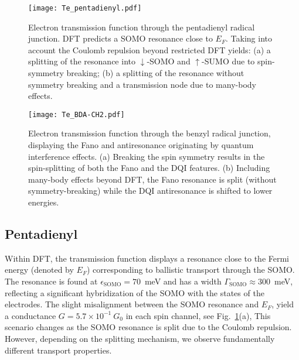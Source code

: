 \documentclass[aps,prx,twocolumn,superscriptaddress]{revtex4-2}
\begin{document}
\begin{figure}[bp]
\texttt{[image: Te\_pentadienyl.pdf]}
\caption{Electron transmission function through the pentadienyl radical junction. 
DFT predicts a SOMO resonance close to $E_F$. Taking into account the Coulomb repulsion beyond restricted DFT yields: 
(a) a splitting of the resonance into $\downarrow$-SOMO and $\uparrow$-SUMO due to spin-symmetry breaking; 
(b) a splitting of the resonance without symmetry breaking and a transmission node 
due to many-body effects. }
\label{fig:Te_pentadienyl}  
\end{figure}


\begin{figure*}[tp]
\texttt{[image: Te\_BDA-CH2.pdf]}
\caption{Electron transmission function through the benzyl radical junction, 
displaying the Fano and antiresonance originating by quantum interference effects. 
(a) Breaking the spin symmetry results in the spin-splitting of both the Fano and the DQI features. 
(b) Including many-body effects beyond DFT, the Fano resonance is split (without symmetry-breaking) 
while the DQI antiresonance is shifted to lower energies.}
\label{fig:Te_BDA-CH2}  
\end{figure*}


\subsection{Pentadienyl}\label{sec:pentadienyl}
Within DFT, the transmission function displays a resonance close to the Fermi energy (denoted by $E_F$) 
corresponding to ballistic transport through the SOMO. 
The resonance is found at $\epsilon_{\mathrm{SOMO}}= 70$~meV 
and has a width $\Gamma_{\mathrm{SOMO}}\approx 300$~meV, 
reflecting a significant 
hybridization of the SOMO with the states of the electrodes.
The slight misalignment between the SOMO resonance and $E_F$, 
yield a conductance $G=5.7 \times 10^{-1} \ G_0$ in each spin channel, see Fig.~\ref{fig:Te_pentadienyl}(a),
This scenario changes as the SOMO resonance is split due to the Coulomb repulsion. 
However, depending on the splitting mechanism, we observe fundamentally different transport properties. 
\end{document}
